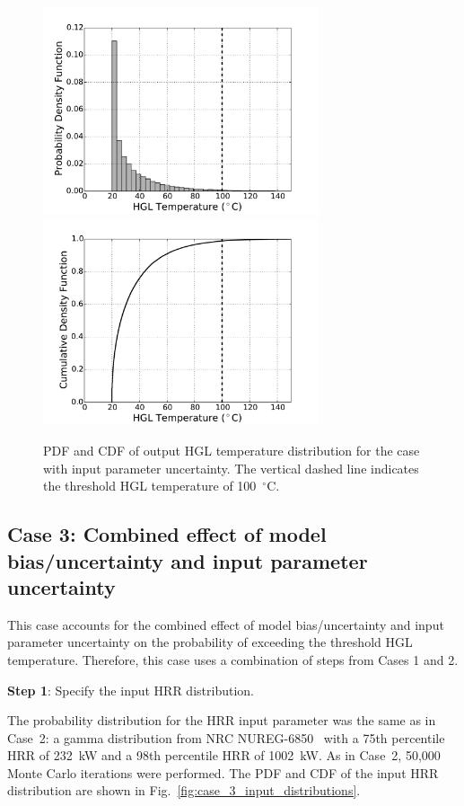 \documentclass[12pt]{article}
\begin{document}
\begin{figure}[p]
\includegraphics[width=3.2in]{Figures/output_PDF_2_input}
\includegraphics[width=3.2in]{Figures/output_CDF_2_input}
\caption{PDF and CDF of output HGL temperature distribution for the case with input parameter uncertainty. The vertical dashed line indicates the threshold HGL temperature of 100~$^\circ$C.}
\label{fig:case_2_output_distributions}
\end{figure}


\clearpage


\subsection{Case 3: Combined effect of model bias/uncertainty and input parameter uncertainty}

This case accounts for the combined effect of model bias/uncertainty and input parameter uncertainty on the probability of exceeding the threshold HGL temperature. Therefore, this case uses a combination of steps from Cases 1 and 2.

\textbf{Step 1}: Specify the input HRR distribution.

The probability distribution for the HRR input parameter was the same as in Case~2: a gamma distribution from NRC NUREG-6850~\cite{NUREG_6850} with a 75th percentile HRR of 232~kW and a 98th percentile HRR of 1002~kW. As in Case~2, 50,000 Monte Carlo iterations were performed. The PDF and CDF of the input HRR distribution are shown in Fig.~\ref{fig:case_3_input_distributions}.
\end{document}

